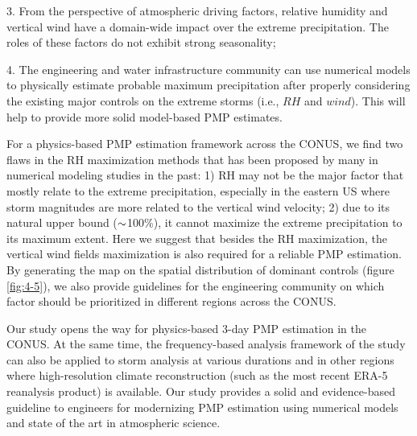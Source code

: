 3.	From the perspective of atmospheric driving factors, relative humidity and vertical wind have a domain-wide impact over the extreme precipitation. The roles of these factors do not exhibit strong seasonality;

4.	The engineering and water infrastructure community can use numerical models to physically estimate probable maximum precipitation after properly considering the existing major controls on the extreme storms (i.e., $RH$ and $wind$). This will help to provide more solid model-based PMP estimates.

For a physics-based PMP estimation framework across the CONUS, we find two flaws in the RH maximization methods that has been proposed by many in numerical modeling studies in the past: 1) RH may not be the major factor that mostly relate to the extreme precipitation, especially in the eastern US where storm magnitudes are more related to the vertical wind velocity; 2) due to its natural upper bound ($\scriptsize{\sim}$100\%), it cannot maximize the extreme precipitation to its maximum extent. Here we suggest that besides the RH maximization, the vertical wind fields maximization is also required for a reliable PMP estimation. By generating the map on the spatial distribution of dominant controls (figure \ref{fig:4-5}), we also provide guidelines for the engineering community on which factor should be prioritized in different regions across the CONUS.

Our study opens the way for physics-based 3-day PMP estimation in the CONUS. At the same time, the frequency-based analysis framework of the study can also be applied to storm analysis at various durations and in other regions where high-resolution climate reconstruction (such as the most recent ERA-5 reanalysis product) is available. Our study provides a solid and evidence-based guideline to engineers for modernizing PMP estimation using numerical models and state of the art in atmospheric science.